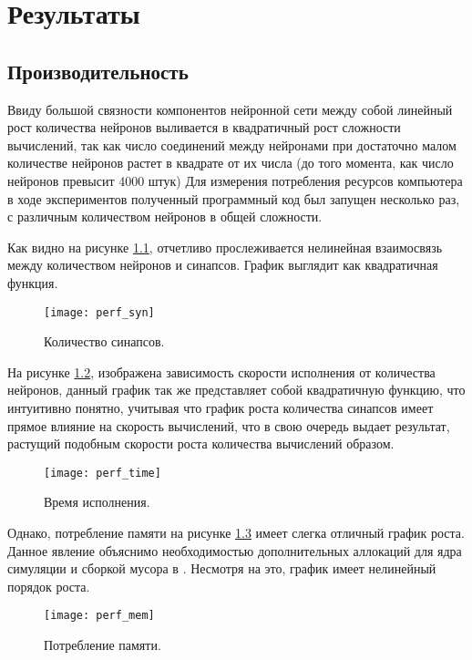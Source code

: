 \chapter{Результаты}
\label{chap:results}
\section{Производительность}
Ввиду большой связности компонентов нейронной сети между собой линейный рост количества нейронов выливается в квадратичный рост сложности вычислений, так как число соединений между нейронами при достаточно малом количестве нейронов растет в квадрате от их числа (до того момента, как число нейронов превысит 4000 штук)
Для измерения потребления ресурсов компьютера в ходе экспериментов полученный программный код был запущен несколько раз, с различным количеством нейронов в общей сложности.

Как видно на рисунке \ref{fig:perf_syn}, отчетливо прослеживается нелинейная взаимосвязь между количеством нейронов и синапсов. График выглядит как квадратичная функция.

\begin{figure}
	\centering
	\texttt{[image: perf\_syn]}
	\caption{Количество синапсов.}
	\label{fig:perf_syn}
\end{figure}

На рисунке \ref{fig:perf_time}, изображена зависимость скорости исполнения от количества нейронов, данный график так же представляет собой квадратичную функцию, что интуитивно понятно, учитывая что график роста количества синапсов имеет прямое влияние на скорость вычислений, что в свою очередь выдает результат, растущий подобным скорости роста количества вычислений образом.

\begin{figure}
	\centering
	\texttt{[image: perf\_time]}
	\caption{Время исполнения.}
	\label{fig:perf_time}
\end{figure}

Однако, потребление памяти на рисунке \ref{fig:perf_mem} имеет слегка отличный график роста. Данное явление объяснимо необходимостью дополнительных аллокаций для ядра симуляции  и сборкой мусора в . Несмотря на это, график имеет нелинейный порядок роста.
\begin{figure}
	\centering
	\texttt{[image: perf\_mem]}
	\caption{Потребление памяти.}
	\label{fig:perf_mem}
\end{figure}


